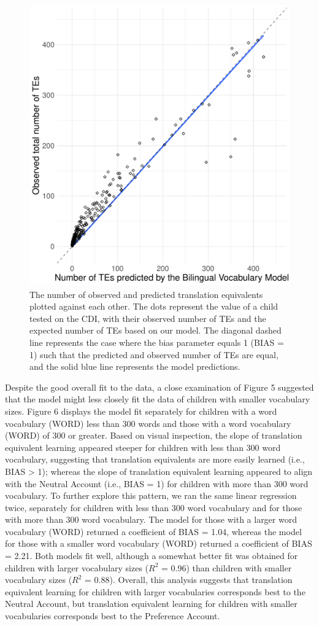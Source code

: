 \documentclass[
  english,
  ,man,floatsintext]{apa6}
\begin{document}
\begin{figure}

{\centering \includegraphics[width=0.6\linewidth,height=0.6\textheight]{paper_TE_bilingual_vocabulary_model_files/figure-latex/fig5-1} 

}

\caption{The number of observed and predicted translation equivalents plotted against each other. The dots represent the value of a child tested on the CDI, with their observed number of TEs and the expected number of TEs based on our model. The diagonal dashed line represents the case where the bias parameter equals 1 (BIAS = 1) such that the predicted and observed number of TEs are equal, and the solid blue line represents the model predictions.}\label{fig:fig5}
\end{figure}

Despite the good overall fit to the data, a close examination of Figure 5 suggested that the model might less closely fit the data of children with smaller vocabulary sizes. Figure 6 displays the model fit separately for children with a word vocabulary (WORD) less than 300 words and those with a word vocabulary (WORD) of 300 or greater. Based on visual inspection, the slope of translation equivalent learning appeared steeper for children with less than 300 word vocabulary, suggesting that translation equivalents are more easily learned (i.e., BIAS \textgreater{} 1); whereas the slope of translation equivalent learning appeared to align with the Neutral Account (i.e., BIAS = 1) for children with more than 300 word vocabulary. To further explore this pattern, we ran the same linear regression twice, separately for children with less than 300 word vocabulary and for those with more than 300 word vocabulary. The model for those with a larger word vocabulary (WORD) returned a coefficient of BIAS = 1.04, whereas the model for those with a smaller word vocabulary (WORD) returned a coefficient of BIAS = 2.21. Both models fit well, although a somewhat better fit was obtained for children with larger vocabulary sizes (\(R^2\) = 0.96) than children with smaller vocabulary sizes (\(R^2\) = 0.88). Overall, this analysis suggests that translation equivalent learning for children with larger vocabularies corresponds best to the Neutral Account, but translation equivalent learning for children with smaller vocabularies corresponds best to the Preference Account.
\end{document}
